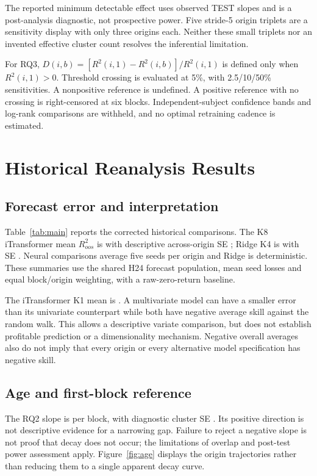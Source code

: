 \documentclass[onecolumn,journal,a4paper,11pt]{IEEEtran}
\begin{document}
The reported minimum detectable effect uses observed TEST slopes and is a
post-analysis diagnostic, not prospective power. Five stride-5 origin
triplets are a sensitivity display with only three origins each. Neither
these small triplets nor an invented effective cluster count resolves the
inferential limitation.

For RQ3, $D(i,b)=[R^2(i,1)-R^2(i,b)]/R^2(i,1)$ is defined only when
$R^2(i,1)>0$. Threshold crossing is evaluated at 5\%, with 2.5/10/50\%
sensitivities. A nonpositive reference is undefined. A positive reference
with no crossing is right-censored at six blocks. Independent-subject
confidence bands and log-rank comparisons are withheld, and no optimal
retraining cadence is estimated.

\section{Historical Reanalysis Results}
\subsection{Forecast error and interpretation}
Table~\ref{tab:main} reports the corrected historical comparisons. The K8
iTransformer mean $R^2_{oos}$ is \KEightRtwo{} with descriptive across-origin
SE \KEightSE{}; Ridge K4 is \RidgeRtwo{} with SE \RidgeSE{}. Neural
comparisons average five seeds per origin and Ridge is deterministic.
These summaries use the shared H24 forecast population, mean seed losses
and equal block/origin weighting, with a raw-zero-return baseline.

The iTransformer K1 mean is \KOneRtwo{}. A multivariate model can have a
smaller error than its univariate counterpart while both have negative
average skill against the random walk. This allows a descriptive variate
comparison, but does not establish profitable prediction or a dimensionality
mechanism. Negative overall averages also do not imply that every origin
or every alternative model specification has negative skill.



\subsection{Age and first-block reference}
The RQ2 slope is \BetaSlope{} per block, with diagnostic cluster SE
\BetaSE{}. Its positive direction is not descriptive evidence for a
narrowing gap. Failure to reject a negative slope is not proof that decay
does not occur; the limitations of overlap and post-test power assessment
apply. Figure~\ref{fig:age} displays the origin trajectories rather than
reducing them to a single apparent decay curve.
\end{document}
